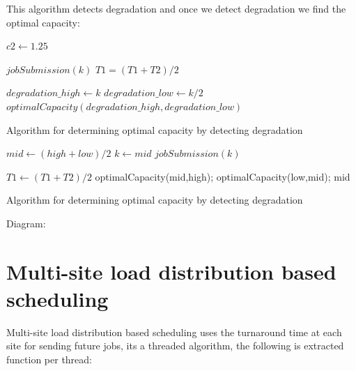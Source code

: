 \documentclass[ms,electronic,double]{nuthesis}
\begin{document}
This algorithm detects degradation and once we detect degradation we find the 
optimal capacity:

\begin{algorithm}
\begin{algorithmic}
\STATE $c2 \gets 1.25$ 

  \STATE $jobSubmission(k)$ 
  \STATE $T1=(T1+T2)/2$
\ENDIF

  \STATE $degradation\_high \gets k$
  \STATE $degradation\_low \gets k/2$
  \STATE $optimalCapacity(degradation\_high,degradation\_low)$
\ENDIF

\ENDWHILE

\end{algorithmic}
\caption{Algorithm for determining optimal capacity by detecting degradation}
\label{alg:Degradation Detection}
\end{algorithm}


\begin{algorithm}
\begin{algorithmic}

\STATE $mid \gets (high+low)/2$ 
\STATE $k \gets mid$
\STATE $jobSubmission(k)$ 

\STATE $T1 \gets (T1+T2)/2$
\STATE optimalCapacity(mid,high);
\ENDIF  
{}
\STATE optimalCapacity(low,mid);
\ENDIF
\RETURN mid
\end{algorithmic}
\caption{Algorithm for determining optimal capacity by detecting degradation}
\label{alg:optimalCapacity(high,low)}
\end{algorithm}


Diagram:

\section{Multi-site load distribution based scheduling}
Multi-site load distribution based scheduling uses the turnaround time at each 
site for sending future jobs, its a threaded algorithm, the following is extracted function per thread:
\end{document}
